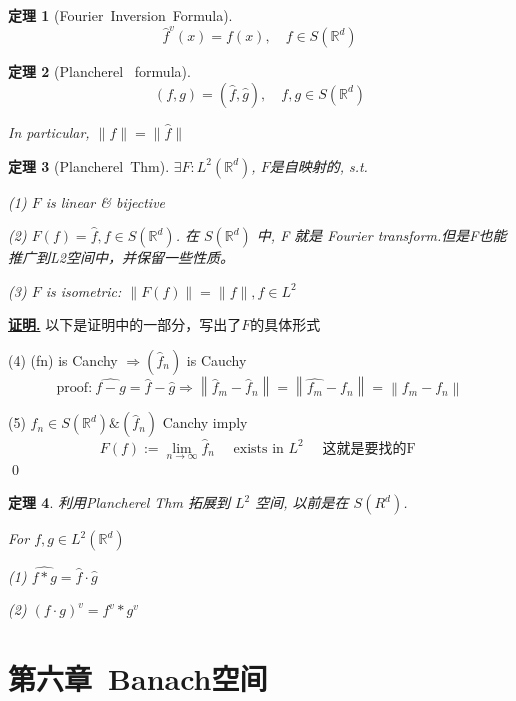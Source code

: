\documentclass[10pt,openany]{book}
\theoremstyle{thmstyle} %
\newtheorem{theorem}{定理}[chapter]
\theoremstyle{defstyle} %
\theoremstyle{prostyle} %
\renewenvironment{proof}[1][证明]{\par\underline{\textbf{#1.}} \;\fangsong}{\qed\par}
\begin{document}
\begin{theorem}[Fourier~Inversion~Formula]
$$
\hat{f}^v(x)=f(x), \quad f \in S\left(\mathbb{R}^d\right)
$$
\end{theorem}


\begin{theorem}[Plancherel ~formula]
$$
(f, g)=(\hat{f}, \hat{g}), \quad f, g \in S(\mathbb{R}^d)
$$

In particular, $\|f\|=\|\hat{f}\|$
\end{theorem}

\begin{theorem}[Plancherel~Thm]

$\exists F: L^2\left(\mathbb{R}^d\right) $, $F$是自映射的,  s.t.

(1) $F$ is linear \& bijective

(2) $F(f)=\hat{f}, f \in S\left(\mathbb{R}^d\right)$. 在 $S\left(\mathbb{R}^d\right)$ 中, F 就是 Fourier transform.但是F也能推广到L2空间中，并保留一些性质。

(3) $F$ is isometric: $\|F(f)\|=\|f\|, f \in L^2$
\end{theorem}

\begin{proof}
以下是证明中的一部分，写出了$F$的具体形式

(4) (fn) is Canchy $\Rightarrow\left(\hat{f}_n\right)$ is Cauchy
$$
\text{proof:}~\widehat{f-g}=\hat{f}-\hat{g} \Rightarrow\left\|\hat{f}_m-\hat{f}_n\right\|=\left\|\hat{f_m}-f_n\right\|=\left\|f_m-f_n\right\|
$$

(5) $ \hat{f}_n \in S\left(\mathbb{R}^d\right) \&\left(\hat{f}_n\right)$ Canchy imply
$$
F(f):=\lim _{n \rightarrow \infty} \hat{f}_n \quad \text { exists in } L^2 \quad \text { 这就是要找的F }
$$
\end{proof}

\begin{theorem}
利用Plancherel Thm 拓展到 $L^2$ 空间, 以前是在 $S(R^d)$.

For $f, g \in L^2\left(\mathbb{R}^d\right)$

(1) $\widehat{f * g}=\hat{f} \cdot \hat{g}$

(2) $(f \cdot g)^v=f^v * g^v$
\end{theorem}





\chapter{第六章~Banach空间}
\end{document}
